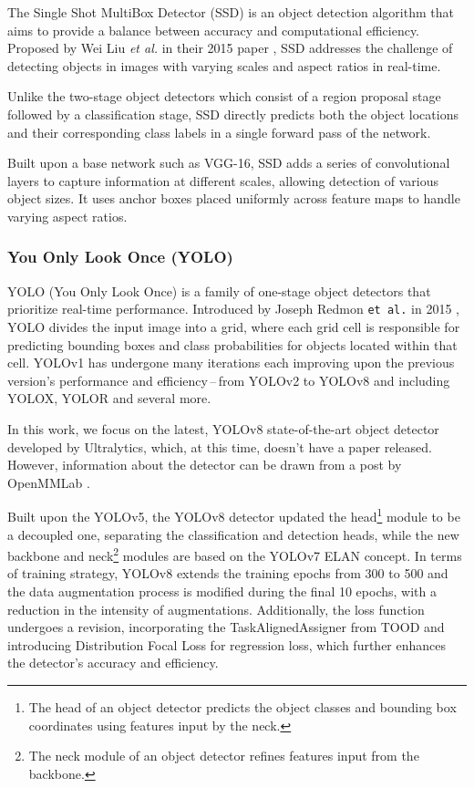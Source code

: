 The Single Shot MultiBox Detector (SSD) is an object detection algorithm that
aims to provide a balance between accuracy and computational efficiency.
Proposed by Wei Liu \textit{et al.} in their 2015 paper \cite{Liu2015}, SSD
addresses the challenge of detecting objects in images with varying scales and
aspect ratios in real-time.

Unlike the two-stage object detectors which consist of a region proposal stage
followed by a classification stage, SSD directly predicts both the object
locations and their corresponding class labels in a single forward pass of the
network.

Built upon a base network such as VGG-16, SSD adds a series of convolutional
layers to capture information at different scales, allowing detection of various
object sizes. It uses anchor boxes placed uniformly across feature maps to
handle varying aspect ratios.

\subsubsection{You Only Look Once (YOLO)}

YOLO (You Only Look Once) is a family of one-stage object detectors that
prioritize real-time performance. Introduced by Joseph Redmon \texttt{et al.} in
2015 \cite{Redmon2015}, YOLO divides the input image into a grid, where each
grid cell is responsible for predicting bounding boxes and class probabilities
for objects located within that cell. YOLOv1 has undergone many iterations each
improving upon the previous version's performance and efficiency\,--\,from
YOLOv2 to YOLOv8 and including YOLOX, YOLOR and several more.

In this work, we focus on the latest, YOLOv8 state-of-the-art object detector
\cite{YOLOv8} developed by Ultralytics, which, at this time, doesn't have a
paper released. However, information about the detector can be drawn from a post
by OpenMMLab \cite{YOLOv8OpenMMLab}.

Built upon the YOLOv5, the YOLOv8 detector updated the head\footnote{The head of
an object detector predicts the object classes and bounding box coordinates
using features input by the neck.} module to be a decoupled one, separating the
classification and detection heads, while the new backbone and neck\footnote{The
neck module of an object detector refines features input from the backbone.}
modules are based on the YOLOv7 ELAN concept. In terms of training strategy,
YOLOv8 extends the training epochs from 300 to 500 and the data augmentation
process is modified during the final 10 epochs, with a reduction in the
intensity of augmentations. Additionally, the loss function undergoes a
revision, incorporating the TaskAlignedAssigner from TOOD and introducing
Distribution Focal Loss for regression loss, which further enhances
the detector's accuracy and efficiency.


